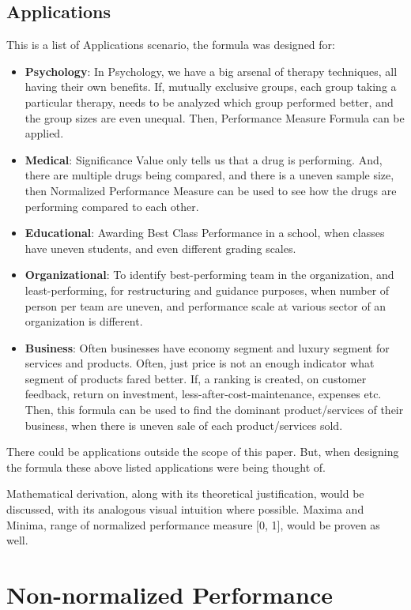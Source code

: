 \documentclass[man,floatsintext]{apa7}
\begin{document}
\subsection{Applications}
This is a list of Applications scenario, the formula was designed for:
\begin{itemize}
	\item \textbf{Psychology}: In Psychology, we have a big arsenal of therapy techniques, all having their own benefits. If, mutually exclusive groups, each group taking a particular therapy, needs to be analyzed which group performed better, and the group sizes are even unequal. Then, Performance Measure Formula can be applied.
	\item \textbf{Medical}: Significance Value only tells us that a drug is performing. And, there are multiple drugs being compared, and there is a uneven sample size, then Normalized Performance Measure can be used to see how the drugs are performing compared to each other.
    \item \textbf{Educational}: Awarding Best Class Performance in a school, when classes have uneven students, and even different grading scales.
    \item \textbf{Organizational}: To identify best-performing team in the organization, and least-performing, for restructuring and guidance purposes, when number of person per team are uneven, and performance scale at various sector of an organization is different.
   \item \textbf{Business}: Often businesses have economy segment and luxury segment for services and products. Often, just price is not an enough indicator what segment of products fared better. If, a ranking is created, on customer feedback, return on investment, less-after-cost-maintenance, expenses etc. Then, this formula can be used to find the dominant product/services of their business, when there is uneven sale of each product/services sold.
\end{itemize}
There could be applications outside the scope of this paper. But, when designing the formula these above listed applications were being thought of.

\hfill \break
Mathematical derivation, along with its theoretical justification, would be discussed, with its analogous visual intuition where possible. Maxima and Minima, range of normalized performance measure [0, 1], would be proven as well.

\section{Non-normalized Performance}
\end{document}
